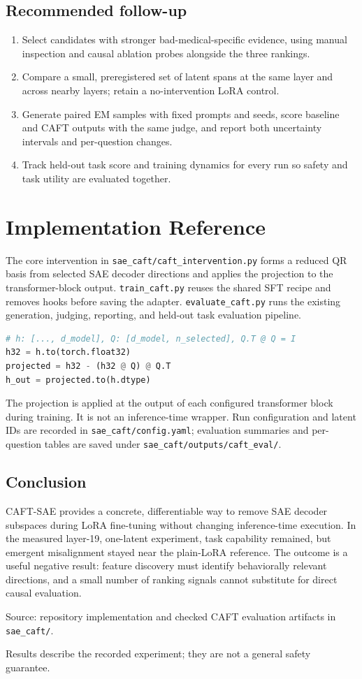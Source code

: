 \documentclass[11pt]{article}
\begin{document}
\subsection{Recommended follow-up}
\begin{enumerate}
  \item Select candidates with stronger bad-medical-specific evidence, using manual inspection and causal ablation probes alongside the three rankings.
  \item Compare a small, preregistered set of latent spans at the same layer and across nearby layers; retain a no-intervention LoRA control.
  \item Generate paired EM samples with fixed prompts and seeds, score baseline and CAFT outputs with the same judge, and report both uncertainty intervals and per-question changes.
  \item Track held-out task score and training dynamics for every run so safety and task utility are evaluated together.
\end{enumerate}

\newpage
\section{Implementation Reference}
The core intervention in \texttt{sae\_caft/caft\_intervention.py} forms a reduced QR basis from selected SAE decoder directions and applies the projection to the transformer-block output. \texttt{train\_caft.py} reuses the shared SFT recipe and removes hooks before saving the adapter. \texttt{evaluate\_caft.py} runs the existing generation, judging, reporting, and held-out task evaluation pipeline.

\begin{lstlisting}[language=Python]
# h: [..., d_model], Q: [d_model, n_selected], Q.T @ Q = I
h32 = h.to(torch.float32)
projected = h32 - (h32 @ Q) @ Q.T
h_out = projected.to(h.dtype)
\end{lstlisting}

The projection is applied at the output of each configured transformer block during training. It is not an inference-time wrapper. Run configuration and latent IDs are recorded in \texttt{sae\_caft/config.yaml}; evaluation summaries and per-question tables are saved under \texttt{sae\_caft/outputs/caft\_eval/}.

\subsection{Conclusion}
CAFT-SAE provides a concrete, differentiable way to remove SAE decoder subspaces during LoRA fine-tuning without changing inference-time execution. In the measured layer-19, one-latent experiment, task capability remained, but emergent misalignment stayed near the plain-LoRA reference. The outcome is a useful negative result: feature discovery must identify behaviorally relevant directions, and a small number of ranking signals cannot substitute for direct causal evaluation.

\vfill
\begin{center}
{\sffamily\small\color{muted}Source: repository implementation and checked CAFT evaluation artifacts in \texttt{sae\_caft/}.}\par
{\sffamily\small\color{muted}Results describe the recorded experiment; they are not a general safety guarantee.}
\end{center}
\end{document}
